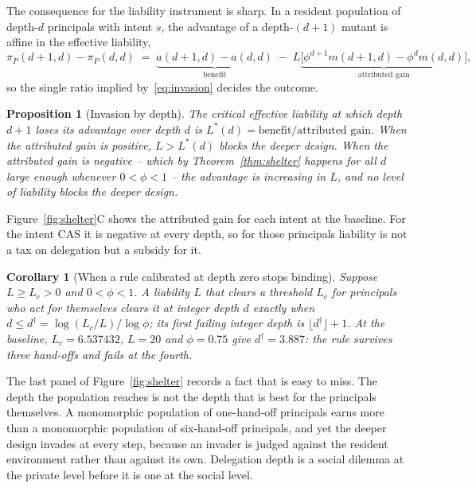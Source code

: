 \documentclass[11pt,a4paper]{article}
\newtheorem{proposition}[theorem]{Proposition}
\newtheorem{corollary}[theorem]{Corollary}
\theoremstyle{definition}
\newcommand{\CAS}{\textsf{CAS}}
\newcommand{\piP}{\pi_{P}}
\begin{document}
The consequence for the liability instrument is sharp. In a resident population
of depth-$d$ principals with intent $s$, the advantage of a depth-$(d+1)$
mutant is affine in the effective liability,
\begin{equation}
  \piP(d{+}1,d)-\piP(d,d)
  \;=\; \underbrace{a(d{+}1,d)-a(d,d)}_{\text{benefit}}
  \;-\; L\underbrace{\bigl[\phi^{d+1}m(d{+}1,d)-\phi^{d}m(d,d)\bigr]}_{\text{attributed gain}} ,
  \label{eq:invasion}
\end{equation}
so the single ratio implied by~\eqref{eq:invasion} decides the outcome.

\begin{proposition}[Invasion by depth]
\label{prop:invasion}
The critical effective liability at which depth $d+1$ loses its advantage over
depth $d$ is $L^{*}(d)=\text{benefit}/\text{attributed gain}$. When the
attributed gain is positive, $L>L^{*}(d)$ blocks the deeper design. When the
attributed gain is negative -- which by Theorem~\ref{thm:shelter} happens for
all $d$ large enough whenever $0<\phi<1$ -- the advantage is increasing in $L$,
and no level of liability blocks the deeper design.
\end{proposition}

Figure~\ref{fig:shelter}C shows the attributed gain for each intent at the
baseline. For the intent \CAS{} it is negative at every depth, so for those
principals liability is not a tax on delegation but a subsidy for it.

\begin{corollary}[When a rule calibrated at depth zero stops binding]
\label{cor:failure}
Suppose $L\ge L_c>0$ and $0<\phi<1$. A liability $L$ that clears a threshold
$L_c$ for principals who act for themselves clears it at integer depth $d$
exactly when $d\le d^{\dagger}=\log(L_c/L)/\log\phi$; its first failing integer
depth is $\lfloor d^{\dagger}\rfloor+1$. At the baseline, $L_c=6.537432$,
$L=20$ and $\phi=0.75$ give $d^{\dagger}=3.887$: the rule survives three
hand-offs and fails at the fourth.
\end{corollary}

The last panel of Figure~\ref{fig:shelter} records a fact that is easy to miss.
The depth the population reaches is not the depth that is best for the
principals themselves. A monomorphic population of one-hand-off principals
earns more than a monomorphic population of six-hand-off principals, and yet
the deeper design invades at every step, because an invader is judged against
the resident environment rather than against its own. Delegation depth is a
social dilemma at the private level before it is one at the social level.
\end{document}
